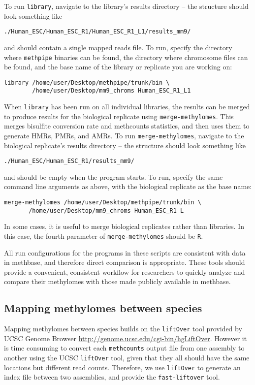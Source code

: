 \documentclass[10pt]{article}
\newcommand{\prog}[1]{\texttt{#1}}
\newcommand{\op}[1]{\texttt{#1}}
\begin{document}
{{To run \prog{library}, navigate to the library's results directory --
the structure should look something like
\begin{verbatim}
./Human_ESC/Human_ESC_R1/Human_ESC_R1_L1/results_mm9/
\end{verbatim}
and should contain a single mapped reads file. To run, specify the directory
where \prog{methpipe} binaries can be found, the directory where chromosome
files can be found, and the base name of the library or replicate you are
working on:
\begin{verbatim}
library /home/user/Desktop/methpipe/trunk/bin \
        /home/user/Desktop/mm9_chroms Human_ESC_R1_L1
\end{verbatim}

When \prog{library} has been run on all individual libraries, the
results can be merged to produce results for the biological replicate using
\prog{merge-methylomes}. This merges bisulfite conversion rate and methcounts
statistics, and then uses them to generate HMRs, PMRs, and AMRs. To run
\prog{merge-methylomes}, navigate to the biological replicate's results
directory -- the structure should look something like
\begin{verbatim}
./Human_ESC/Human_ESC_R1/results_mm9/
\end{verbatim}
and should be empty when the program starts. To run, specify the same command
line arguments as above, with the biological replicate as the base name:
\begin{verbatim}
merge-methylomes /home/user/Desktop/methpipe/trunk/bin \
       /home/user/Desktop/mm9_chroms Human_ESC_R1 L
\end{verbatim}

In some cases, it is useful to merge biological replicates rather than
libraries. In this case, the fourth parameter of
\prog{merge-methylomes} should be \op{R}.

All run configurations for the programs in these scripts are
consistent with data in methbase, and therefore direct comparison is
appropriate. These tools should provide a convenient, consistent
workflow for researchers to quickly analyze and compare their
methylomes with those made publicly available in methbase.

\subsection{Mapping methylomes between species}
\label{sec:mapp-methyl-betw}
Mapping methylomes between species builds on the \prog{liftOver} tool
provided by UCSC Genome Browser
\url{http://genome.ucsc.edu/cgi-bin/hgLiftOver}. However it is time
consuming to convert each \prog{methcounts} output file from one
assembly to another using the UCSC \prog{liftOver} tool, given that
they all should have the same locations but different read counts. 
Therefore, we use \prog{liftOver} to generate an index file between 
two assemblies, and provide the \prog{fast-liftover} tool.

}}
\end{document}
